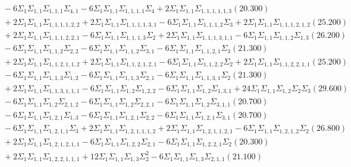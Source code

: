 \documentclass[12pt]{article}
\begin{document}
\begin{landscape}
\begin{align*}
		&\quad\quad -6\Sigma_{1}\Sigma_{1,1}\Sigma_{1,1,1}\Sigma_{4,1}-6\Sigma_{1}\Sigma_{1,1}\Sigma_{1,1,1,1}\Sigma_{4}+2\Sigma_{1}\Sigma_{1,1}\Sigma_{1,1,1,1,1,3}(20.300) \\ 
		&\quad\quad +2\Sigma_{1}\Sigma_{1,1}\Sigma_{1,1,1,1,2,2}+2\Sigma_{1}\Sigma_{1,1}\Sigma_{1,1,1,1,3,1}-6\Sigma_{1}\Sigma_{1,1}\Sigma_{1,1,1,2}\Sigma_{3}+2\Sigma_{1}\Sigma_{1,1}\Sigma_{1,1,1,2,1,2}(25.200) \\ 
		&\quad\quad +2\Sigma_{1}\Sigma_{1,1}\Sigma_{1,1,1,2,2,1}-6\Sigma_{1}\Sigma_{1,1}\Sigma_{1,1,1,3}\Sigma_{2}+2\Sigma_{1}\Sigma_{1,1}\Sigma_{1,1,1,3,1,1}-6\Sigma_{1}\Sigma_{1,1}\Sigma_{1,1,2}\Sigma_{1,3}(26.200) \\ 
		&\quad\quad -6\Sigma_{1}\Sigma_{1,1}\Sigma_{1,1,2}\Sigma_{2,2}-6\Sigma_{1}\Sigma_{1,1}\Sigma_{1,1,2}\Sigma_{3,1}-6\Sigma_{1}\Sigma_{1,1}\Sigma_{1,1,2,1}\Sigma_{3}(21.300) \\ 
		&\quad\quad +2\Sigma_{1}\Sigma_{1,1}\Sigma_{1,1,2,1,1,2}+2\Sigma_{1}\Sigma_{1,1}\Sigma_{1,1,2,1,2,1}-6\Sigma_{1}\Sigma_{1,1}\Sigma_{1,1,2,2}\Sigma_{2}+2\Sigma_{1}\Sigma_{1,1}\Sigma_{1,1,2,2,1,1}(25.200) \\ 
		&\quad\quad -6\Sigma_{1}\Sigma_{1,1}\Sigma_{1,1,3}\Sigma_{1,2}-6\Sigma_{1}\Sigma_{1,1}\Sigma_{1,1,3}\Sigma_{2,1}-6\Sigma_{1}\Sigma_{1,1}\Sigma_{1,1,3,1}\Sigma_{2}(21.300) \\ 
		&\quad\quad +2\Sigma_{1}\Sigma_{1,1}\Sigma_{1,1,3,1,1,1}-6\Sigma_{1}\Sigma_{1,1}\Sigma_{1,2}\Sigma_{1,2,2}-6\Sigma_{1}\Sigma_{1,1}\Sigma_{1,2}\Sigma_{1,3,1}+24\Sigma_{1}\Sigma_{1,1}\Sigma_{1,2}\Sigma_{2}\Sigma_{3}(29.600) \\ 
		&\quad\quad -6\Sigma_{1}\Sigma_{1,1}\Sigma_{1,2}\Sigma_{2,1,2}-6\Sigma_{1}\Sigma_{1,1}\Sigma_{1,2}\Sigma_{2,2,1}-6\Sigma_{1}\Sigma_{1,1}\Sigma_{1,2}\Sigma_{3,1,1}(20.700) \\ 
		&\quad\quad -6\Sigma_{1}\Sigma_{1,1}\Sigma_{1,2,1}\Sigma_{1,3}-6\Sigma_{1}\Sigma_{1,1}\Sigma_{1,2,1}\Sigma_{2,2}-6\Sigma_{1}\Sigma_{1,1}\Sigma_{1,2,1}\Sigma_{3,1}(20.700) \\ 
		&\quad\quad -6\Sigma_{1}\Sigma_{1,1}\Sigma_{1,2,1,1}\Sigma_{3}+2\Sigma_{1}\Sigma_{1,1}\Sigma_{1,2,1,1,1,2}+2\Sigma_{1}\Sigma_{1,1}\Sigma_{1,2,1,1,2,1}-6\Sigma_{1}\Sigma_{1,1}\Sigma_{1,2,1,2}\Sigma_{2}(26.800) \\ 
		&\quad\quad +2\Sigma_{1}\Sigma_{1,1}\Sigma_{1,2,1,2,1,1}-6\Sigma_{1}\Sigma_{1,1}\Sigma_{1,2,2}\Sigma_{2,1}-6\Sigma_{1}\Sigma_{1,1}\Sigma_{1,2,2,1}\Sigma_{2}(20.300) \\ 
		&\quad\quad +2\Sigma_{1}\Sigma_{1,1}\Sigma_{1,2,2,1,1,1}+12\Sigma_{1}\Sigma_{1,1}\Sigma_{1,3}\Sigma_{2}^{2}-6\Sigma_{1}\Sigma_{1,1}\Sigma_{1,3}\Sigma_{2,1,1}(21.100) \\ 

\end{align*}
\end{landscape}
\end{document}
